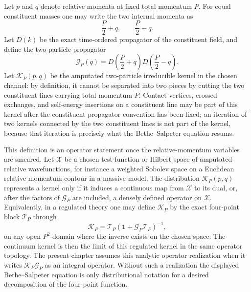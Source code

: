 Let \(p\) and \(q\) denote relative momenta at fixed total momentum \(P\).
For equal constituent masses one may write the two internal momenta as
\[
  \frac{P}{2}+q,\qquad \frac{P}{2}-q .
\]
Let \(D(k)\) be the exact time-ordered propagator of the constituent field,
and define the two-particle propagator
\[
  \mathcal G_P(q)
  =
  D\!\left(\frac{P}{2}+q\right)
  D\!\left(\frac{P}{2}-q\right).
\]
Let \(\mathcal K_P(p,q)\) be the amputated two-particle irreducible kernel in
the chosen channel: by definition, it cannot be separated into two pieces by
cutting the two constituent lines carrying total momentum \(P\). Contact
vertices, crossed exchanges, and self-energy insertions on a constituent line
may be part of this kernel after the constituent propagator convention has been
fixed; an iteration of two kernels connected by the two constituent lines is
not part of the kernel, because that iteration is precisely what the
Bethe--Salpeter equation resums.

This definition is an operator statement once the relative-momentum variables
are smeared.  Let \(\mathcal X\) be a chosen test-function or Hilbert space of
amputated relative wavefunctions, for instance a weighted Sobolev space on a
Euclidean relative-momentum contour in a massive model.  The distribution
\(\mathcal K_P(p,q)\) represents a kernel only if it induces a continuous map
from \(\mathcal X\) to its dual, or, after the factors of
\(\mathcal G_P\) are included, a densely defined operator on \(\mathcal X\).
Equivalently, in a regulated theory one may define \(\mathcal K_P\) by the
exact four-point block \(\mathcal T_P\) through
\[
  \mathcal K_P
  =
  \mathcal T_P(\mathbf 1+\mathcal G_P\mathcal T_P)^{-1},
\]
on any open \(P^2\)-domain where the inverse exists on the chosen space.  The
continuum kernel is then the limit of this regulated kernel in the same
operator topology.  The present chapter assumes this analytic operator
realization when it writes \(\mathcal K_P\mathcal G_P\) as an integral
operator.  Without such a realization the displayed Bethe--Salpeter equation is
only distributional notation for a desired decomposition of the four-point
function.

